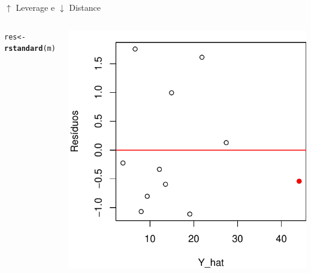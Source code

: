 \documentclass{beamer}\usepackage[]{graphicx}\usepackage[]{color}
\makeatletter
\newcommand{\hlstd}[1]{\textcolor[rgb]{0.345,0.345,0.345}{#1}}%
\newcommand{\hlkwb}[1]{\textcolor[rgb]{0.69,0.353,0.396}{#1}}%
\newcommand{\hlkwd}[1]{\textcolor[rgb]{0.737,0.353,0.396}{\textbf{#1}}}%
\newenvironment{kframe}{%
 \def\at@end@of@kframe{}%
 \ifinner\ifhmode%
  \def\at@end@of@kframe{\end{minipage}}%
  \begin{minipage}{\columnwidth}%
 \fi\fi%
 \def\FrameCommand##1{\hskip\@totalleftmargin \hskip-\fboxsep
 \colorbox{shadecolor}{##1}\hskip-\fboxsep
     \hskip-\linewidth \hskip-\@totalleftmargin \hskip\columnwidth}%
 \MakeFramed {\advance\hsize-\width
   \@totalleftmargin\z@ \linewidth\hsize
   \@setminipage}}%
 {\par\unskip\endMakeFramed%
 \at@end@of@kframe}
\newenvironment{knitrout}{}{} %
\renewenvironment{knitrout}{\setlength{\topsep}{0mm}}{}
\makeatother
\begin{document}
\begin{frame}{$\uparrow$ Leverage e $\downarrow$ Distance}
\begin{columns}[c]
\begin{knitrout}\tiny
{}\color{fgcolor}\begin{kframe}
\begin{alltt}
\hlstd{res} \hlkwb{<-} \hlkwd{rstandard}\hlstd{(m)}
\end{alltt}
\end{kframe}
\includegraphics[width=1\linewidth]{figure/inf100-1} 

\end{knitrout}

\end{columns}
\end{frame}
\end{document}
